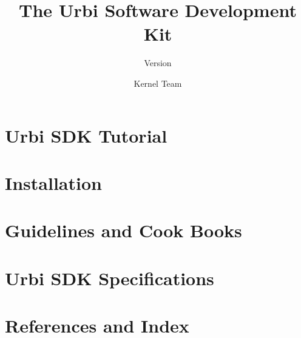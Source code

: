 \documentclass[openright,twoside,11pt]{book}
\title{The Urbi Software Development Kit}
\subtitle{Version \VcsDescription}
\author{Kernel Team}
\begin{document}
\maketitle



\tableofcontents

\part{Urbi SDK Tutorial}



\part{Installation}


\part{Guidelines and Cook Books}



\part{Urbi SDK Specifications}



\part{References and Index}

\printindex
\end{document}
